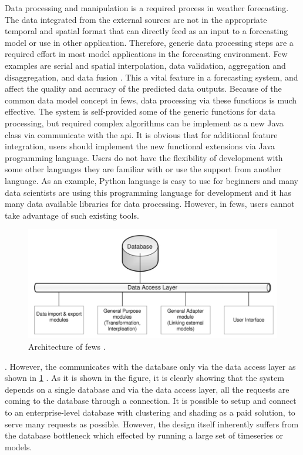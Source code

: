 Data processing and manipulation is a required process in weather forecasting. 
The data integrated from the external sources are not in the appropriate temporal and spatial format that can directly feed as an input to a forecasting model or use in other application. Therefore, generic data processing steps are a required effort in most model applications in the forecasting environment. Few examples are serial and spatial interpolation, data validation, aggregation and disaggregation, and data fusion \cite{Werner2013TheSystem}. This a vital feature in a forecasting system, and affect the quality and accuracy of the predicted data outputs. Because of the common data model concept in \acrshort{fews}, data processing via these functions is much effective. The system is self-provided some of the generic functions for data processing, but required complex algorithms can be implement as a new Java class via communicate with the \acrfull{api}. It is obvious that for additional feature integration, users should implement the new functional extensions via Java programming language. Users do not have the flexibility of development with some other languages they are familiar with or use the support from another language. As an example, Python language is easy to use for beginners and many data scientists are using this programming language for development and it has many data available libraries for data processing. However, in \acrshort{fews}, users cannot take advantage of such existing tools.

\begin{figure}[htp]
    \centering
    \includegraphics[width=1.0\textwidth]{lit/fews/Architecture-of-Delft-FEWS-showing-the-data-base-the-data-access-layers-and-examples-of_W640.png}
    \caption[Architecture of \acrshort{fews}]{Architecture of \acrshort{fews} \cite{Werner2013TheSystem}.}
    \label{fi:fews_data_layer}
\end{figure}
. However, the communicates with the database only via the data access layer as shown in \cref{fi:fews_data_layer} \cite{Werner2013TheSystem}. As it is shown in the figure, it is clearly showing that the system depends on a single database and via the data access layer, all the requests are coming to the database through a connection. It is possible to setup and connect to an enterprise-level database with clustering and shading as a paid solution, to serve many requests as possible. However, the design itself inherently suffers from the database bottleneck which effected by running a large set of timeseries or models.

